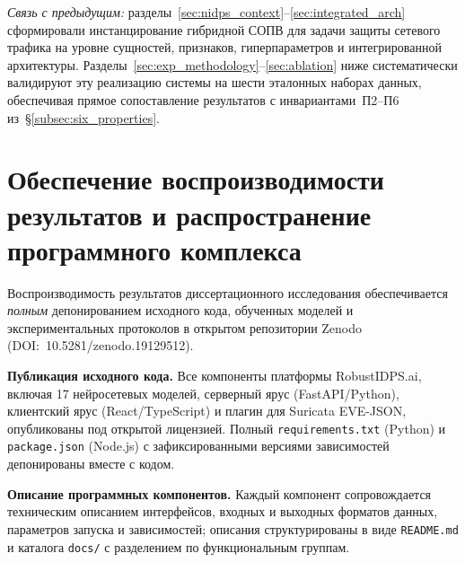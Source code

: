

\medskip
\noindent\emph{Связь с предыдущим:} разделы~\ref{sec:nidps_context}--\ref{sec:integrated_arch}
сформировали инстанцирование гибридной СОПВ для задачи защиты
сетевого трафика на уровне сущностей, признаков, гиперпараметров и
интегрированной архитектуры. Разделы~\ref{sec:exp_methodology}--\ref{sec:ablation}
ниже систематически валидируют эту реализацию системы на шести
эталонных наборах данных, обеспечивая прямое сопоставление
результатов с инвариантами~П2--П6 из~\S\ref{subsec:six_properties}.



\section{Обеспечение воспроизводимости результатов и распространение программного комплекса}
\label{sec:reproducibility}

Воспроизводимость результатов диссертационного исследования обеспечивается
\emph{полным} депонированием исходного кода, обученных моделей и
экспериментальных протоколов в открытом репозитории Zenodo
(DOI:~10.5281/zenodo.19129512).

\textbf{Публикация исходного кода.} Все компоненты платформы
RobustIDPS.ai, включая 17 нейросетевых моделей, серверный ярус
(FastAPI/Python), клиентский ярус (React/TypeScript) и плагин для
Suricata EVE-JSON, опубликованы под открытой лицензией. Полный
\texttt{requirements.txt} (Python) и \texttt{package.json} (Node.js)
с зафиксированными версиями зависимостей депонированы вместе с кодом.

\textbf{Описание программных компонентов.} Каждый компонент сопровождается
техническим описанием интерфейсов, входных и выходных форматов данных,
параметров запуска и зависимостей; описания структурированы в виде
\texttt{README.md} и каталога \texttt{docs/} с разделением по
функциональным группам.

